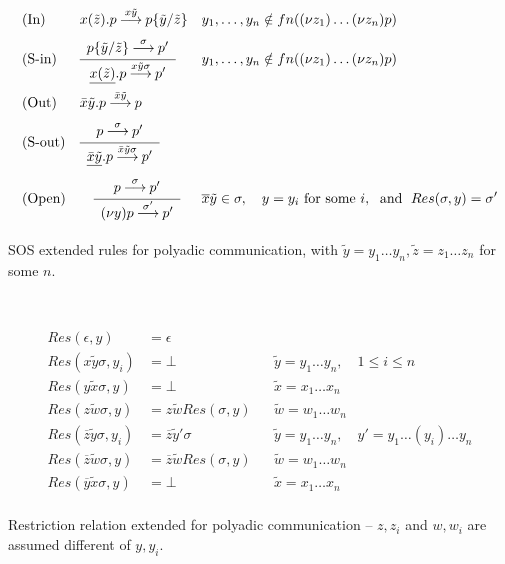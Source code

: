 \documentclass[submission,copyright,creativecommons]{eptcs}
\newcommand{\sost}[2]{\mbox{$\{#1/#2\}$}}
\newcommand{\deriv}[1]{{\mbox{${\:\stackrel{#1}{\longrightarrow}\:}$}}}
\newcommand{\bigfrac}[2]{
\renewcommand{\arraystretch}{1.5}
\begin{array}{c}#1\\
\hline
#2
\end{array}}
\newcommand{\restr}[1]{\mbox{$({\bf\nu} #1)$}}
\newcommand{\undef}{\mbox{$\bot$}}
\newcommand{\vect}[1]{\ensuremath{\tilde{#1}}}
\begin{document}
\begin{table}
\hrulefill\\[-.8cm]

\begin{align*}
& \mbox{(In)}    & &  x(\vect z).p\deriv{x \vect y}p\sost{\vect y}{\vect z} & & y_1, \ldots, y_n \notin fn(\restr{z_1}\ldots\restr{z_n}p) \\
& \mbox{(S-in)}  & & \bigfrac{p\sost{\vect y}{\vect z}\deriv{\sigma}p'}{\underline{x(\vect z)}.p\deriv{x \vect y\sigma}p'} & & y_1, \ldots, y_n \notin fn(\restr{z_1}\ldots\restr{z_n}p)\\ 
& \mbox{(Out)}  & & \bar{x} \vect y.p\deriv{\bar{x} \vect y}p \\
& \mbox{(S-out)} & & \bigfrac{p\deriv{\sigma}p'}{\underline{\bar{x} \vect y}.p\deriv{\bar{x} \vect y\sigma}p'} \\
& \mbox{(Open)} & & \quad \bigfrac{p\deriv{\sigma}p'}{\restr{y}p\deriv{\sigma'}
p'} & & \overline{x} \vect y \in \sigma, \quad y = y_i \text{ for some }i, \; \mbox{ and }  \; Res(\sigma, y)= \sigma'  
\end{align*}
\hrulefill
\caption{SOS extended rules for polyadic communication, with $\vect y = y_1 \ldots y_n, \vect z = z_1 \ldots z_n$ for some $n$. }\label{pcrules}
\end{table}

\begin{table}
\hrulefill\\[-.7cm]
{\renewcommand{\arraystretch}{3}}

\begin{align*}
Res(\epsilon, y) & = \epsilon \\
Res(x \vect y \sigma, y_i) & = \undef  & & \vect y = y_1 \ldots y_n, \quad 1 \leq i \leq n \\
%
Res(y \vect x \sigma, y) & = \undef & & \vect x = x_1 \ldots x_n \\
Res(z \vect w \sigma, y)   & = z \vect w Res(\sigma, y) & & \vect w = w_1 \ldots w_n \\
%
Res(\overline{z} \vect y \sigma, y_i) & = \overline{z} \vect y' \sigma & & \vect y = y_1 \ldots y_n, \quad y' = y_1 \ldots (y_i) \ldots y_n\\
Res(\overline{z} \vect w \sigma, y) & = \overline{z} \vect w  Res(\sigma, y) & & \vect w = w_1 \ldots w_n \\
Res(\overline{y} \vect x \sigma, y) & = \undef & & \vect x = x_1 \ldots x_n \\[-.7cm]
\end{align*}

\hrulefill
\caption{Restriction relation extended for polyadic communication -- $z, z_i$ and $w, w_i$ are assumed different of $y, y_i$.}\label{pcrestr}
\end{table}
\end{document}
